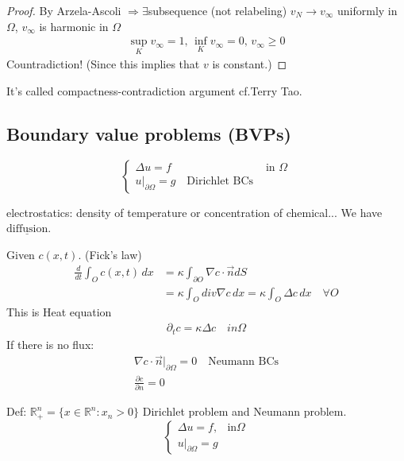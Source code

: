 \documentclass[11pt]{article}
\begin{document}
\begin{proof}
    By Arzela-Ascoli $\Longrightarrow \exists $subsequence (not relabeling) $v_{N} \to v_{\infty}$ 
    uniformly in $\Omega$, $v_{\infty}$ is harmonic in $\Omega$
    \begin{align*}
        \sup_{K}v_{\infty} = 1,\, \inf_{K} v_{\infty}=0,\, v_{\infty}\ge 0
    \end{align*}
    Countradiction! (Since this implies that $v$ is constant.)
\end{proof}
\begin{remark}
    It's called compactness-contradiction argument cf.Terry Tao.
\end{remark}

\subsection{Boundary value problems (BVPs)}
\begin{equation}
    \begin{cases} 
        \Delta u = f & \text{ in }\Omega \\ 
        u|_{\partial \Omega} = g  \quad \text{Dirichlet BCs} 
    \end{cases}
\end{equation}

\begin{example}
    electrostatics: density of temperature or concentration of chemical... We have $\underline{\text{diffusion}}$.
    
    Given $c(x,t)$. (Fick's law)
    \begin{align*}
        \frac{d}{dt} \int_{O}c(x,t)\,dx  &= \kappa \int_{\partial O}\nabla c \cdot \vec{n} dS\\
        &= \kappa \int_{O}div \nabla c \, dx = \kappa \int_{O} \Delta c \, dx \quad \forall O
    \end{align*}
    This is Heat equation 
    \begin{align*}
        \partial_{t}c = \kappa \Delta c \quad in \Omega
    \end{align*}
    If there is no flux:
    \begin{align*}
        \nabla c \cdot \vec{n}|_{\partial \Omega} = 0 \quad \text{Neumann BCs}\\
        \frac{\partial c}{\partial n} = 0
    \end{align*}
\end{example}


Def: $\mathbb{R}_{+}^{n} = \{ x \in \mathbb{R}^{n}: x_{n} > 0 \}$
Dirichlet problem and Neumann problem. 
\begin{equation}
    \begin{cases} 
    \Delta u = f, & \text{in} \Omega  \\ 
    u|_{\partial \Omega} = g   
    \end{cases}
\end{equation}
\end{document}
